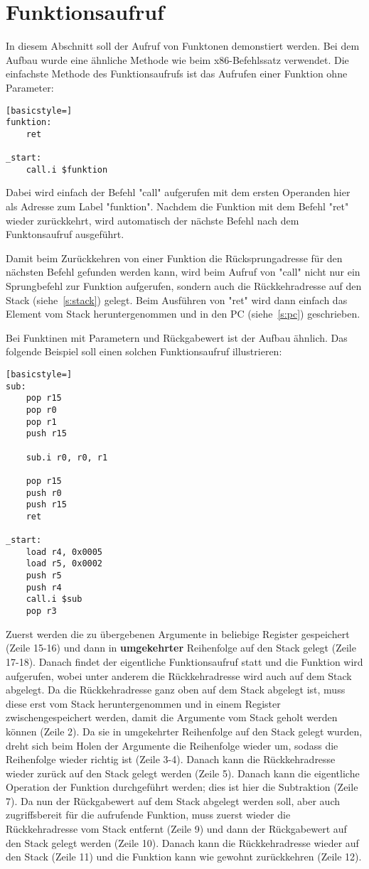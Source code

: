 \section{Funktionsaufruf}
In diesem Abschnitt soll der Aufruf von Funktonen demonstiert werden. Bei dem
Aufbau wurde eine ähnliche Methode wie beim x86-Befehlssatz verwendet. Die
einfachste Methode des Funktionsaufrufs ist das Aufrufen einer Funktion ohne
Parameter:
\begin{lstlisting}[basicstyle=]
funktion:
	ret

_start:
	call.i $funktion
\end{lstlisting}
Dabei wird einfach der Befehl "call" aufgerufen mit dem ersten Operanden hier
als Adresse zum Label "funktion". Nachdem die Funktion mit dem Befehl "ret"
wieder zurückkehrt, wird automatisch der nächste Befehl nach dem Funktonsaufruf
ausgeführt.

Damit beim Zurückkehren von einer Funktion die Rücksprungadresse für den
nächsten Befehl gefunden werden kann, wird beim Aufruf von "call" nicht nur ein
Sprungbefehl zur Funktion aufgerufen, sondern auch die Rückkehradresse auf den
Stack (siehe~\ref{s:stack}) gelegt. Beim Ausführen von "ret" wird dann einfach
das Element vom Stack heruntergenommen und in den PC (siehe~\ref{s:pc})
geschrieben.

Bei Funktinen mit Parametern und Rückgabewert ist der Aufbau ähnlich. Das
folgende Beispiel soll einen solchen Funktionsaufruf illustrieren:
\begin{lstlisting}[basicstyle=]
sub:
	pop r15
	pop r0
	pop r1
	push r15

	sub.i r0, r0, r1

	pop r15
	push r0
	push r15
	ret

_start:
	load r4, 0x0005
	load r5, 0x0002
	push r5
	push r4
	call.i $sub
	pop r3
\end{lstlisting}
Zuerst werden die zu übergebenen Argumente in beliebige Register gespeichert
(Zeile 15-16) und dann in \textbf{umgekehrter} Reihenfolge auf den Stack gelegt
(Zeile 17-18). Danach findet der eigentliche Funktionsaufruf statt und die
Funktion wird aufgerufen, wobei unter anderem die Rückkehradresse wird auch auf
dem Stack abgelegt. Da die Rückkehradresse ganz oben auf dem Stack abgelegt ist,
muss diese erst vom Stack heruntergenommen und in einem Register
zwischengespeichert werden, damit die Argumente vom Stack geholt werden können
(Zeile 2). Da sie in umgekehrter Reihenfolge auf den Stack gelegt wurden, dreht
sich beim Holen der Argumente die Reihenfolge wieder um, sodass die Reihenfolge
wieder richtig ist (Zeile 3-4). Danach kann die Rückkehradresse wieder zurück
auf den Stack gelegt werden (Zeile 5). Danach kann die eigentliche Operation der
Funktion durchgeführt werden; dies ist hier die Subtraktion (Zeile 7). Da nun
der Rückgabewert auf dem Stack abgelegt werden soll, aber auch zugriffsbereit
für die aufrufende Funktion, muss zuerst wieder die Rückkehradresse vom Stack
entfernt (Zeile 9) und dann der Rückgabewert auf den Stack gelegt werden (Zeile
10). Danach kann die Rückkehradresse wieder auf den Stack (Zeile 11) und die
Funktion kann wie gewohnt zurückkehren (Zeile 12).

